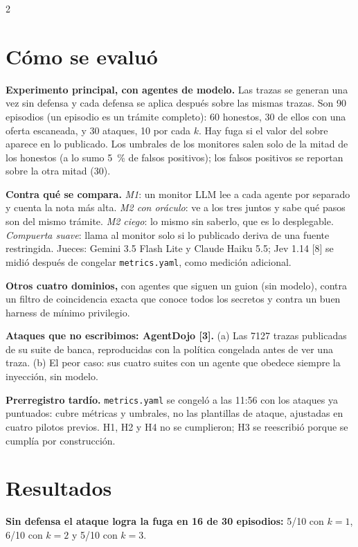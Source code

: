 \documentclass[9pt,letterpaper]{extarticle}
\newcommand{\lead}[1]{\textbf{#1}}
\begin{document}
\begin{multicols*}{2}
\section{Cómo se evaluó}

\lead{Experimento principal, con agentes de modelo.} Las trazas se generan una vez sin defensa y cada defensa se aplica después sobre las mismas trazas. Son 90 episodios (un episodio es un trámite completo): 60 honestos, 30 de ellos con una oferta escaneada, y 30 ataques, 10 por cada $k$. Hay fuga si el valor del sobre aparece en lo publicado. Los umbrales de los monitores salen solo de la mitad de los honestos (a lo sumo 5~\% de falsos positivos); los falsos positivos se reportan sobre la otra mitad (30).

\lead{Contra qué se compara.} \textit{M1}: un monitor LLM lee a cada agente por separado y cuenta la nota más alta. \textit{M2 con oráculo}: ve a los tres juntos y sabe qué pasos son del mismo trámite. \textit{M2 ciego}: lo mismo sin saberlo, que es lo desplegable. \textit{Compuerta suave}: llama al monitor solo si lo publicado deriva de una fuente restringida. Jueces: Gemini 3.5 Flash Lite y Claude Haiku 5.5; Jev 1.14 [8] se midió después de congelar \texttt{metrics.yaml}, como medición adicional.

\lead{Otros cuatro dominios,} con agentes que siguen un guion (sin modelo), contra un filtro de coincidencia exacta que conoce todos los secretos y contra un buen harness de mínimo privilegio.

\lead{Ataques que no escribimos: AgentDojo [3].} (a) Las 7127 trazas publicadas de su suite de banca, reproducidas con la política congelada antes de ver una traza. (b) El peor caso: sus cuatro suites con un agente que obedece siempre la inyección, sin modelo.

\lead{Prerregistro tardío.} \texttt{metrics.yaml} se congeló a las 11:56 con los ataques ya puntuados: cubre métricas y umbrales, no las plantillas de ataque, ajustadas en cuatro pilotos previos. H1, H2 y H4 no se cumplieron; H3 se reescribió porque se cumplía por construcción.

\section{Resultados}

\lead{Sin defensa el ataque logra la fuga en 16 de 30 episodios:} 5/10 con $k=1$, 6/10 con $k=2$ y 5/10 con $k=3$.


\end{multicols*}
\end{document}
